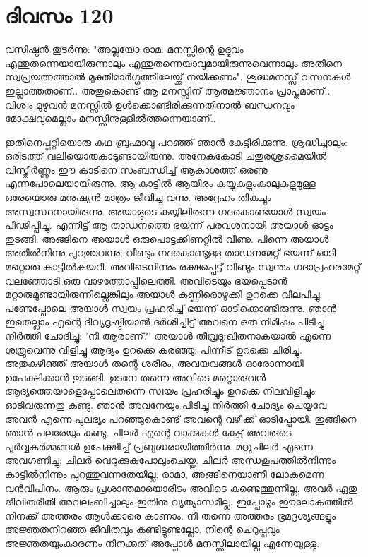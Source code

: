  
\section{ദിവസം 120}


വസിഷ്ഠന്‍ തുടര്‍ന്നു: "അല്ലയോ രാമ: മനസ്സിന്റെ ഉദ്ഭവം എന്തുതന്നെയായിരുന്നാലും എന്തുതന്നെയാവുമായിരുന്നുവെന്നാലും അതിനെ സ്വപ്രയത്നത്താല്‍ മുക്തിമാര്‍ഗ്ഗത്തിലേയ്ക്ക്‌ നയിക്കണം". ശുദ്ധമനസ്സ്‌ വസനകള്‍ ഇല്ലാത്തതാണ്‌.. അതുകൊണ്ട്‌ ആ മനസ്സിന്‌ ആത്മജ്ഞാനം പ്രാപ്തമാണ്‌.. വിശ്വം മുഴുവന്‍ മനസ്സില്‍ ഉള്‍ക്കൊണ്ടിരിക്കുന്നതിനാല്‍ ബന്ധനവും മോക്ഷവുമെല്ലാം മനസ്സിനുള്ളില്‍ത്തന്നെയാണ്‌..

ഇതിനെപ്പറ്റിയൊരു കഥ ബ്രഹ്മാവു പറഞ്ഞ്‌ ഞാന്‍ കേട്ടിരിക്കുന്നു. ശ്രദ്ധിച്ചാലും: ഒരിടത്ത്‌ വലിയൊരുകാടുണ്ടായിരുന്നു. അനേകകോടി ചതുരശ്രമൈയില്‍ വിസ്തീര്‍ണ്ണം ഈ കാടിനെ സംബന്ധിച്ച്‌ ആകാശത്ത്‌ ഒരണു എന്നപോലെയായിരുന്നു. ആ കാട്ടില്‍ ആയിരം കയ്യുകളുംകാലുകളുമുള്ള ഒരേയൊരു മനുഷ്യന്‍ മാത്രം ജീവിച്ചു വന്നു. അദ്ദേഹം തികച്ചും അസ്വസ്ഥനായിരുന്നു. അയാളുടെ കയ്യിലിരുന്ന ഗദകൊണ്ടയാള്‍ സ്വയം പീഢിപ്പിച്ചു. എന്നിട്ട്‌ ആ താഡനത്തെ ഭയന്ന് പരവശനായി അയാള്‍ ഓട്ടം തുടങ്ങി. അങ്ങിനെ അയാള്‍ ഒരുപൊട്ടക്കിണറ്റില്‍ വീണു. പിന്നെ അയാള്‍ അതില്‍നിന്നു പുറത്തുവന്നു; വീണ്ടും ഗദകൊണ്ടുള്ള താഡനമേറ്റ്‌ ഭയന്ന് ഓടി മറ്റൊരു കാട്ടില്‍കയറി. അവിടെനിന്നും രക്ഷപ്പെട്ട്‌ വീണ്ടും സ്വന്തം ഗദാപ്രഹരമേറ്റ്‌ വലഞ്ഞോടി ഒരു വാഴത്തോപ്പിലെത്തി. അവിടെയും  ഭയപ്പെടാന്‍ മറ്റാരുമുണ്ടായിരുന്നില്ലെങ്കിലും അയാള്‍ കണ്ണീരൊഴുക്കി ഉറക്കെ വിലപിച്ചു. പണ്ടേപ്പോലെ അയാള്‍ സ്വയം പ്രഹരിച്ച്‌ ഭയന്ന് ഓടിക്കൊണ്ടിരുന്നു. ഞാന്‍ ഇതെല്ലാം എന്റെ ദിവ്യദൃഷ്ടിയാല്‍ ദര്‍ശിച്ചിട്ട്‌ അവനെ ഒരു നിമിഷം പിടിച്ചു നിര്‍ത്തി ചോദിച്ചു: 'നീ ആരാണ്‌?' അയാള്‍ തീവ്രദു:ഖിതനാകയാല്‍ എന്നെ ശത്രുവെന്നു വിളിച്ചു ആദ്യം ഉറക്കെ കരഞ്ഞു; പിന്നീട്‌ ഉറക്കെ ചിരിച്ചു. അതുകഴിഞ്ഞ്‌ അയാള്‍ തന്റെ ശരീരം, അവയവങ്ങള്‍ ഓരോന്നായി ഉപേക്ഷിക്കാന്‍ തുടങ്ങി. ഉടനേ തന്നെ അവിടെ മറ്റൊരുവന്‍ ആദ്യത്തെയാളെപ്പോലെതന്നെ സ്വയം പ്രഹരിച്ചും ഉറക്കെ നിലവിളിച്ചും ഓടിവരുന്നതു കണ്ടു. ഞാന്‍ അവനേയും പിടിച്ചു നിര്‍ത്തി ചോദ്യം ചെയ്യവേ അവന്‍ എന്നെ പുലഭ്യം പറഞ്ഞുകൊണ്ട്‌ അവന്റെ വഴിക്ക്‌ ഓടിപ്പോയി. ഇങ്ങിനെ ഞാന്‍ പലരേയും കണ്ടു. ചിലര്‍ എന്റെ വാക്കുകള്‍ കേട്ട്‌ അവരുടെ പൂര്‍വ്വകര്‍മ്മങ്ങള്‍ ഉപേക്ഷിച്ച്‌ പ്രബുദ്ധരായിത്തീര്‍ന്നു. മറ്റുചിലര്‍ എന്നെ അവഗണിച്ചു; ചിലര്‍ വെറുക്കുകപോലുംചെയ്തു. ചിലര്‍ അന്ധകൂപത്തില്‍നിന്നും കാട്ടില്‍നിന്നും പുറത്തുവന്നതേയില്ല. രാമാ, അങ്ങിനെയാണീ ലോകമെന്ന വന്‍വിപിനം. ആരും പ്രശാന്തമായൊരിടം അവിടെ കണ്ടെത്തുന്നില്ല, അവര്‍ ഏതു ജീവിതരീതി അവലംബിച്ചാലും ഇതിനു വ്യത്യാസമില്ല. ഇപ്പോഴും ഈലോകത്തില്‍ നിനക്ക്‌ അത്തരം ആള്‍ക്കാരെ കാണാം. നീ തന്നെ അത്തരം ഭ്രമദൃശ്യങ്ങളും അജ്ഞതനിറഞ്ഞ ജീവിതവും കണ്ടിട്ടുണ്ടല്ലോ. നിന്റെ ചെറുപ്പവും അജ്ഞതയുംകാരണം നിനക്കത്‌ അപ്പോള്‍ മനസ്സിലായില്ല എന്നേയുള്ളു.  

